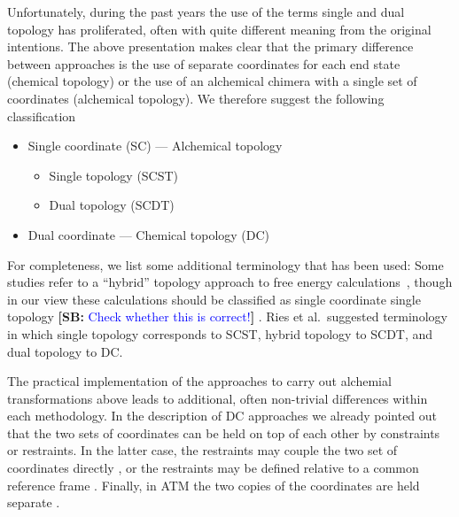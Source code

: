 \documentclass[9pt,bestpractices]{livecoms}
\newcommand{\sbnote}[1]{%
  {\bfseries{}[SB: }%
  {\textcolor{blue}{#1}}{\bfseries{}]}
}
\begin{document}
Unfortunately, during the past years the use of the terms single and dual topology has proliferated, often with quite different meaning from the original intentions. The above presentation makes clear that the primary difference between approaches is the use of separate coordinates for each end state (chemical topology) or the use of an alchemical chimera with a single set of coordinates (alchemical topology). We therefore suggest the following classification
\begin{itemize}
\item Single coordinate (SC) --- Alchemical topology
  \begin{itemize}
  \item Single topology (SCST)
    \item Dual topology (SCDT)
  \end{itemize}
  \item Dual coordinate --- Chemical topology (DC)
  \end{itemize}
For completeness, we list some additional terminology that has been used: Some studies refer to a ``hybrid'' topology approach to free energy calculations~\cite{gapsys2015pmx, gapsys2016accurate, gapsys2020large}, though in our view these calculations should be classified as single coordinate single topology \sbnote{Check whether this is correct!}. %
Ries et al.\ suggested terminology \cite{Ries_2022} in which single topology corresponds to SCST, hybrid topology to SCDT, and dual topology to DC.

The practical implementation of the approaches to carry out alchemial transformations above leads to additional, often non-trivial differences within each methodology. In the description of DC approaches we already pointed out that the two sets of coordinates can be held on top of each other by constraints \cite{jiang2019computing,lee2023aces} or restraints. In the latter case, the restraints may couple the two set of coordinates directly \cite{Axelsen_1998,Ries_2022}, or the restraints may be defined relative to a common reference frame \cite{rocklin2013separated,Baumann_2023}. Finally, in ATM the two copies of the coordinates are held separate \cite{Azimi_2022}.
\end{document}

